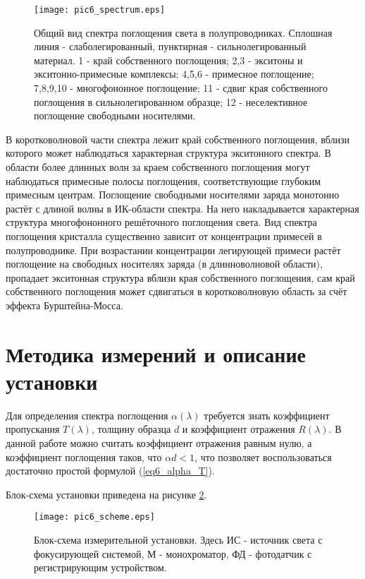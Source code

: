 \begin{figure}[h!]\centering
\texttt{[image: pic6\_spectrum.eps]}
\caption{Общий вид спектра поглощения света в полупроводниках. Сплошная линия - слаболегированный, пунктирная - сильнолегированный материал. 1 - край собственного поглощения; 2,3 - экситоны и экситонно-примесные комплексы; 4,5,6 - примесное поглощение; 7,8,9,10 - многофононное поглощение; 11 - сдвиг края собственного поглощения в сильнолегированном образце; 12 - неселективное поглощение свободными носителями.}
\label{pic6_spectrum}
\end{figure}

В коротковолновой части спектра лежит край собственного поглощения, вблизи которого может наблюдаться характерная структура экситонного спектра. В области более длинных волн за краем собственного поглощения могут наблюдаться примесные полосы поглощения, соответствующие глубоким примесным центрам. Поглощение свободными носителями заряда монотонно растёт с длиной волны в ИК-области спектра. На него накладывается характерная структура многофононного решёточного поглощения света. Вид спектра поглощения кристалла существенно зависит от концентрации примесей в полупроводнике. При возрастании концентрации легирующей примеси растёт поглощение на свободных носителях заряда (в длинноволновой области), пропадает экситонная структура вблизи края собственного поглощения, сам край собственного поглощения может сдвигаться в коротковолновую область за счёт эффекта Бурштейна-Мосса.

\section{Методика измерений и описание установки}
Для определения спектра поглощения $\alpha(\lambda)$ требуется знать коэффициент пропускания $T(\lambda)$, толщину образца $d$ и коэффициент отражения $R(\lambda)$. В данной работе можно считать коэффициент отражения равным нулю, а коэффициент поглощения таков, что $\alpha d < 1$, что позволяет воспользоваться достаточно простой формулой (\ref{eq6_alpha_T}).

Блок-схема установки приведена на рисунке \ref{pic6_scheme}.

\begin{figure}[h!]\centering
\texttt{[image: pic6\_scheme.eps]}
\caption{Блок-схема измерительной установки. Здесь ИС - источник света с фокусирующей системой, М - монохроматор, ФД - фотодатчик с регистрирующим устройством.}
\label{pic6_scheme}
\end{figure}

